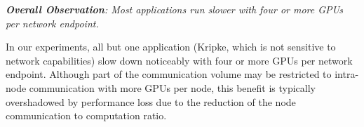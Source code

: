 

\vspace{1em}
\noindent
{\it \textbf{Overall Observation}:
Most applications run slower with four or more GPUs per network endpoint.} 

\noindent In our experiments, all but one application (Kripke, which is not
sensitive to network capabilities) slow down noticeably with four or more GPUs per network
endpoint.
Although part of the communication volume may be restricted to intra-node communication
with more GPUs per node, this benefit is typically overshadowed by performance
loss due to the reduction of the node communication to computation ratio.  









